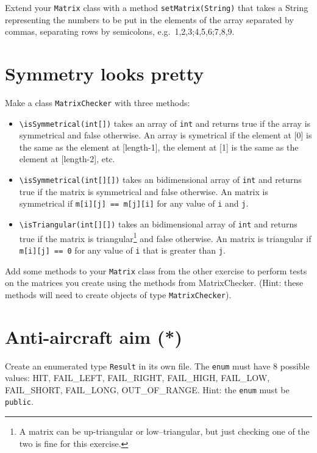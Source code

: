 \documentclass{article}
\begin{document}
Extend your \verb+Matrix+ class with a method \verb+setMatrix(String)+
that takes a String representing the numbers to be put in the elements
of the array separated by commas, separating rows by semicolons,
e.g.~1,2,3;4,5,6;7,8,9. 

\section{Symmetry looks pretty}
\label{sec:symm-looks-pretty}

Make a class \verb+MatrixChecker+ with three methods: 

\begin{itemize}
\item \verb+\isSymmetrical(int[])+ takes an array of \verb+int+ and
  returns true if the array is symmetrical and false otherwise. An
  array is symetrical if the element at [0] is the same as the
  element at [length-1], the element at [1] is the same as the
  element at [length-2], etc.
\item \verb+\isSymmetrical(int[][])+ takes an bidimensional array of
  \verb+int+ and returns true if the matrix is symmetrical and false
  otherwise. An matrix is symmetrical if \verb+m[i][j] == m[j][i]+ for
  any value of \verb+i+ and \verb+j+.
\item \verb+\isTriangular(int[][])+ takes an bidimensional array of
  \verb+int+ and returns true if the matrix is triangular\footnote{A
    matrix can be up-triangular or low--triangular, but just checking
    one of the two is fine for this exercise.} and false
  otherwise. An matrix is triangular if \verb+m[i][j] == 0+ for
  any value of \verb+i+ that is greater than \verb+j+.
\end{itemize}

Add some methods to your \verb+Matrix+ class from the other exercise to
perform tests on the matrices you create using the methods from
MatrixChecker. (Hint: these methods will need to create objects of
type \verb+MatrixChecker+). 


\section{Anti-aircraft aim (*)}
\label{sec:anti-aircraft-aim}

Create an enumerated type \verb+Result+ in its own file. The
\verb+enum+ must have 8 possible values: HIT, FAIL\_LEFT, FAIL\_RIGHT,
FAIL\_HIGH, FAIL\_LOW, FAIL\_SHORT, FAIL\_LONG, OUT\_OF\_RANGE. Hint:
the \verb+enum+ must be \verb+public+.
\end{document}

